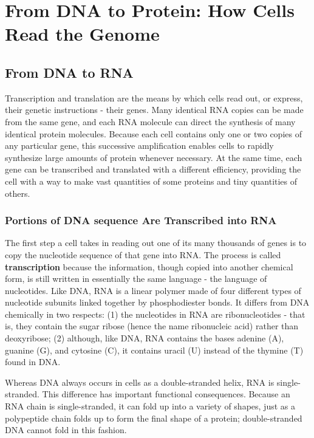 \chapter{From DNA to Protein: How Cells Read the Genome}

\section{From DNA to RNA}

Transcription and translation are the means by which cells read out, or
express, their genetic instructions - their genes. Many identical RNA copies
can be made from the same gene, and each RNA molecule can direct
the synthesis of many identical protein molecules. Because each cell
contains only one or two copies of any particular gene, this successive
amplification enables cells to rapidly synthesize large amounts of protein
whenever necessary. At the same time, each gene can be transcribed
and translated with a different efficiency, providing the cell with a way
to make vast quantities of some proteins and tiny quantities of others.

\subsection{Portions of DNA sequence Are Transcribed into RNA}

The first step a cell takes in reading out one of its many thousands of
genes is to copy the nucleotide sequence of that gene into RNA. The process
is called \textbf{transcription} because the information, though copied into
another chemical form, is still written in essentially the same language -
the language of nucleotides. Like DNA, RNA is a linear polymer made of
four different types of nucleotide subunits linked together by phosphodiester
bonds. It differs from DNA chemically in two respects:
(1) the nucleotides in RNA are ribonucleotides - that is, they contain the
sugar ribose (hence the name ribonucleic acid) rather than deoxyribose;
(2) although, like DNA, RNA contains the bases adenine (A), guanine (G),
and cytosine (C), it contains uracil (U) instead of the thymine (T) found
in DNA.

Whereas DNA always occurs in cells as a
double-stranded helix, RNA is single-stranded. This difference has important
functional consequences. Because an RNA chain is single-stranded,
it can fold up into a variety of shapes, just as a polypeptide chain folds
up to form the final shape of a protein; double-stranded DNA cannot fold in this fashion.

